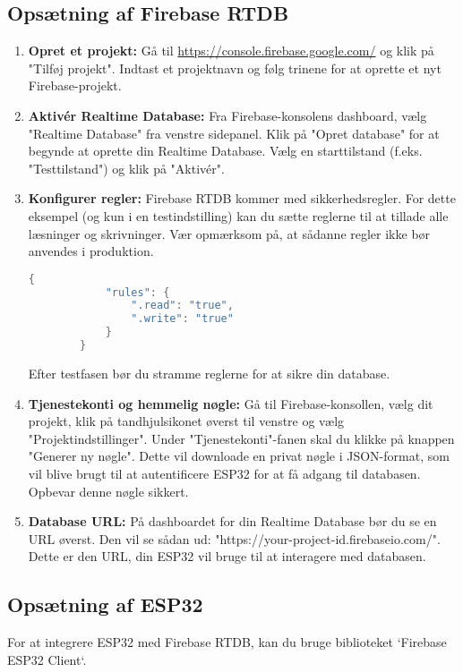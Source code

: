 \subsection*{Opsætning af Firebase RTDB}
\begin{enumerate}
	\item \textbf{Opret et projekt:} Gå til \url{https://console.firebase.google.com/} og klik på "Tilføj projekt". Indtast et projektnavn og følg trinene for at oprette et nyt Firebase-projekt.
	
	\item \textbf{Aktivér Realtime Database:} Fra Firebase-konsolens dashboard, vælg "Realtime Database" fra venstre sidepanel. Klik på "Opret database" for at begynde at oprette din Realtime Database. Vælg en starttilstand (f.eks. "Testtilstand") og klik på "Aktivér".
	
	\item \textbf{Konfigurer regler:} Firebase RTDB kommer med sikkerhedsregler. For dette eksempel (og kun i en testindstilling) kan du sætte reglerne til at tillade alle læsninger og skrivninger. Vær opmærksom på, at sådanne regler ikke bør anvendes i produktion.
	\begin{lstlisting}[language=C++]
		{
			"rules": {
				".read": "true",
				".write": "true"
			}
		}
	\end{lstlisting}
	Efter testfasen bør du stramme reglerne for at sikre din database.
	
	\item \textbf{Tjenestekonti og hemmelig nøgle:} Gå til Firebase-konsollen, vælg dit projekt, klik på tandhjulsikonet øverst til venstre og vælg "Projektindstillinger". Under "Tjenestekonti"-fanen skal du klikke på knappen "Generer ny nøgle". Dette vil downloade en privat nøgle i JSON-format, som vil blive brugt til at autentificere ESP32 for at få adgang til databasen. Opbevar denne nøgle sikkert.
	
	\item \textbf{Database URL:} På dashboardet for din Realtime Database bør du se en URL øverst. Den vil se sådan ud: "https://your-project-id.firebaseio.com/". Dette er den URL, din ESP32 vil bruge til at interagere med databasen.
\end{enumerate}

\subsection*{Opsætning af ESP32}
For at integrere ESP32 med Firebase RTDB, kan du bruge biblioteket `Firebase ESP32 Client`.

